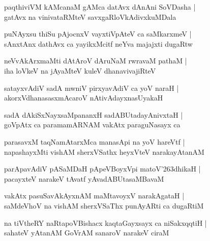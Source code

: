 \documentclass[twoside,12pt,openright]{book}
\def\S{\char'263}
\newcounter{shloka}[chapter]
\begin{document}
\begin{shloka}
paqthiviVM kAMcanaM gAMca datAvx dAnAni SoVDasha |\\
gatAvx na vinivataRMteV savxgaRloVkAdivxkuMDala 
\end{shloka}

\begin{shloka}
puNAyxsu thiSu pAjocnxV vayxtiVpAteV ca saMkarxmeV |\\
sAnxtAnx dathAvx ca yayikxMcitf neYva majajxti dugaRtw 
\end{shloka}

\begin{shloka}
neVvAkArxmaMti dAtAroV dAruNaM rwravaM pathaM |\\
iha loVkeV na jAyaMteV kuleV dhanavivajiRteV 
\end{shloka}

\begin{shloka}
satayxvAdiV sadA mwniV pirxyavAdiV ca yoV naraH |\\
akorxVdhanasasxmAcaroV nAtivAdayxnasUyakaH 
\end{shloka}

\begin{shloka}
sadA dAkiSxNayxsaMpananxH sadABUtadayAnivxtaH |\\
goVpAtx ca paramamARNAM vakAtx paraguNasayx ca
\end{shloka}

\begin{shloka}
parasavxM taqNamAtarxMca manasApi na yoV hareVtf |\\
napashayxMti vishAM sherxVSathx heyxVteV narakayAtanAM 
\end{shloka}

\begin{shloka}
parApavAdiV pASaMDaH pApeVBoyxVpi matoV\S dhikaH |\\
pacayxteV narakeV tAvatf yAvadABUtasaMBavaM 
\end{shloka}

\begin{shloka}
vakAtx pasuSavAkAyxnAM maMtavoyxV narakAgataH |\\
saMdeVhoV na vishAM sherxVSaThx punAyARti ca dugaRtiM 
\end{shloka}

\begin{shloka}
na tiVtheRY naRtapoVBishacx kaqtaGayxsayx ca niSakxqqtiH |\\
sahateV yAtanAM GoVrAM sanaroV narakeV ciraM 
\end{shloka}
\end{document}
